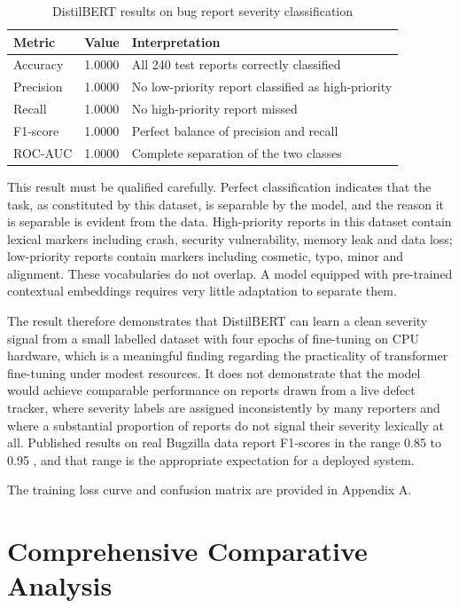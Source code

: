 \documentclass[12pt,a4paper,oneside]{report}
\newcommand{\tabfont}{\fontsize{11}{13}\selectfont\setlength{\tabcolsep}{4pt}}
\begin{document}
\begin{table}[H]
\centering
\caption{DistilBERT results on bug report severity classification}
\label{tab:bert}
\tabfont
\begin{tabular}{L{28mm}C{20mm}L{78mm}}
\toprule
\textbf{Metric} & \textbf{Value} & \textbf{Interpretation} \\
\midrule
Accuracy  & 1.0000 & All 240 test reports correctly classified \\
Precision & 1.0000 & No low-priority report classified as high-priority \\
Recall    & 1.0000 & No high-priority report missed \\
F1-score  & 1.0000 & Perfect balance of precision and recall \\
ROC-AUC   & 1.0000 & Complete separation of the two classes \\
\bottomrule
\end{tabular}
\end{table}

This result must be qualified carefully. Perfect classification indicates that the task, as constituted by this dataset, is separable by the model, and the reason it is separable is evident from the data. High-priority reports in this dataset contain lexical markers including crash, security vulnerability, memory leak and data loss; low-priority reports contain markers including cosmetic, typo, minor and alignment. These vocabularies do not overlap. A model equipped with pre-trained contextual embeddings requires very little adaptation to separate them.

The result therefore demonstrates that DistilBERT can learn a clean severity signal from a small labelled dataset with four epochs of fine-tuning on CPU hardware, which is a meaningful finding regarding the practicality of transformer fine-tuning under modest resources. It does not demonstrate that the model would achieve comparable performance on reports drawn from a live defect tracker, where severity labels are assigned inconsistently by many reporters and where a substantial proportion of reports do not signal their severity lexically at all. Published results on real Bugzilla data report F1-scores in the range 0.85 to 0.95 \cite{chen2022}, and that range is the appropriate expectation for a deployed system.

The training loss curve and confusion matrix are provided in Appendix A.

\section{Comprehensive Comparative Analysis}
\end{document}
